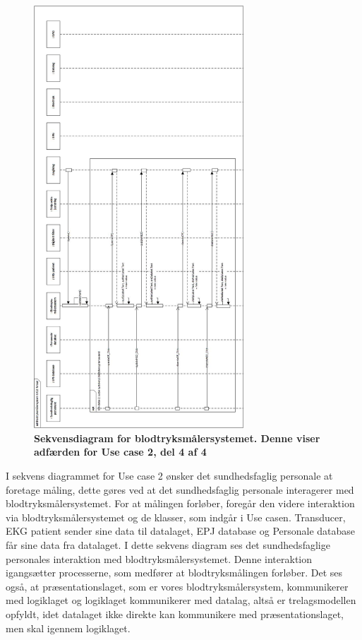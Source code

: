\begin{figure}[H]
\includegraphics[width =0.7\textwidth , center]{billeder/sdUC2_4}
\caption{\textbf{Sekvensdiagram for blodtryksmålersystemet. Denne viser adfærden for Use case 2, del 4 af 4}}
\end{figure}
I sekvens diagrammet for Use case 2 ønsker det sundhedsfaglig personale at foretage måling, dette gøres ved at det sundhedsfaglig personale interagerer med blodtryksmålersystemet. For at målingen forløber, foregår den videre interaktion via blodtryksmålersystemet og de klasser, som indgår i Use casen. Transducer, EKG patient sender sine data til datalaget, EPJ database og Personale database får sine data fra datalaget. I dette sekvens diagram ses det sundhedsfaglige personales interaktion med blodtryksmålersystemet. Denne interaktion igangsætter processerne, som medfører at blodtryksmålingen forløber. Det ses også, at præsentationslaget, som er vores blodtryksmålersystem, kommunikerer med logiklaget og logiklaget kommunikerer med datalag, altså er trelagsmodellen opfyldt, idet datalaget ikke direkte kan kommunikere med præsentationslaget, men skal igennem logiklaget. \\\\
